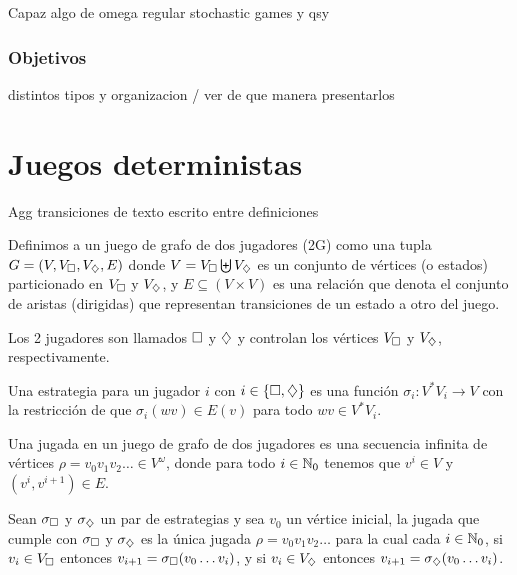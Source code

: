 Capaz algo de omega regular stochastic games y qsy

\subsubsection{Objetivos}

distintos tipos y organizacion / ver de que manera presentarlos

\section{Juegos deterministas}

Agg transiciones de texto escrito entre definiciones

\begin{definition}
	Definimos a un juego de grafo de dos jugadores (2G) como una tupla $G = (V, V_\square,V_\diamondsuit, E)$ donde $V = V_\square \biguplus V_\diamondsuit$ es un conjunto de vértices (o estados) particionado en $V_\square$ y $V_\diamondsuit$, y $E \subseteq (V\times V)$ es una relación que denota el conjunto de aristas (dirigidas) que representan transiciones de un estado a otro del juego.

	Los 2 jugadores son llamados $\square$ y $\diamondsuit$ y controlan los vértices
	$V_\square$ y $V_\diamondsuit$, respectivamente.
\end{definition}

\begin{definition}
	Una estrategia para un jugador $i$ con $i \in \{\square, \diamondsuit\}$ es una función $\sigma_i: V^*V_i \rightarrow V$ con la restricción de que $\sigma_i(wv) \in E(v)$ para todo $wv \in V^*V_i$.
\end{definition}

\begin{definition}
	Una jugada en un juego de grafo de dos jugadores es una secuencia infinita de vértices $\rho = v_0v_1v_2 \dots \in V^\omega$, donde para todo $i \in \mathbb{N}_0$ tenemos que $v^i \in V$ y $(v^i, v^{i+1}) \in E$.

	Sean $\sigma_\square$ y $\sigma_\diamondsuit$ un par de estrategias y sea $v_0$ un
	vértice inicial, la jugada que cumple con $\sigma_\square$ y $\sigma_\diamondsuit$ es la
	única jugada $\rho = v_0 v_1 v_2 \dots$ para la cual cada $i \in \mathbb{N}_0$, si $v_i
		\in V_\square$ entonces $v_{i+1} = \sigma_\square(v_0 \dots v_i)$, y si $v_i \in
		V_\diamondsuit$ entonces $v_{i+1} = \sigma_\diamondsuit(v_0 \dots v_i)$.
\end{definition}

